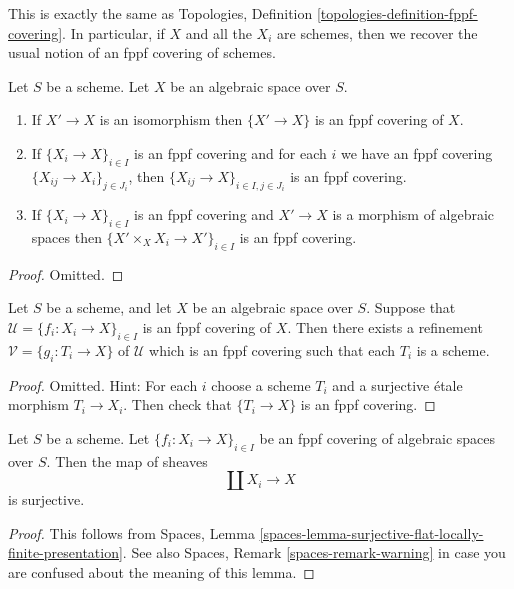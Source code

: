 \noindent
This is exactly the same as
Topologies, Definition \ref{topologies-definition-fppf-covering}.
In particular, if $X$ and all the $X_i$ are schemes, then we recover the usual
notion of an fppf covering of schemes.

\begin{lemma}
\label{lemma-fppf}
Let $S$ be a scheme.
Let $X$ be an algebraic space over $S$.
\begin{enumerate}
\item If $X' \to X$ is an isomorphism then $\{X' \to X\}$
is an fppf covering of $X$.
\item If $\{X_i \to X\}_{i\in I}$ is an fppf covering and for each
$i$ we have an fppf covering $\{X_{ij} \to X_i\}_{j\in J_i}$, then
$\{X_{ij} \to X\}_{i \in I, j\in J_i}$ is an fppf covering.
\item If $\{X_i \to X\}_{i\in I}$ is an fppf covering
and $X' \to X$ is a morphism of algebraic spaces then
$\{X' \times_X X_i \to X'\}_{i\in I}$ is an fppf covering.
\end{enumerate}
\end{lemma}

\begin{proof}
Omitted.
\end{proof}

\begin{lemma}
\label{lemma-refine-fppf-schemes}
Let $S$ be a scheme, and let $X$ be an algebraic space over $S$.
Suppose that $\mathcal{U} = \{f_i : X_i \to X\}_{i \in I}$ is an
fppf covering of $X$. Then there exists a refinement
$\mathcal{V} = \{g_i : T_i \to X\}$ of $\mathcal{U}$ which is an
fppf covering such that each $T_i$ is a scheme.
\end{lemma}

\begin{proof}
Omitted. Hint: For each $i$ choose a scheme $T_i$ and a surjective \'etale
morphism $T_i \to X_i$. Then check that $\{T_i \to X\}$ is an fppf covering.
\end{proof}

\begin{lemma}
\label{lemma-fppf-covering-surjective}
Let $S$ be a scheme.
Let $\{f_i : X_i \to X\}_{i \in I}$ be an fppf covering of algebraic
spaces over $S$. Then the map of sheaves
$$
\coprod X_i \longrightarrow X
$$
is surjective.
\end{lemma}

\begin{proof}
This follows from
Spaces, Lemma \ref{spaces-lemma-surjective-flat-locally-finite-presentation}.
See also
Spaces, Remark \ref{spaces-remark-warning}
in case you are confused about the meaning of this lemma.
\end{proof}

